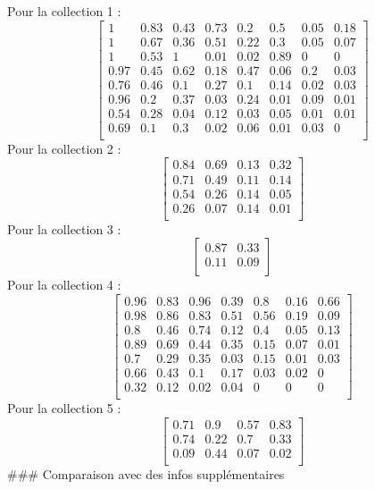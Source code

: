 Pour la collection 1 :
\[\begin{bmatrix} 1 &0.83 &0.43 &0.73 &0.2 &0.5 &0.05 &0.18 \\1 &0.67 &0.36 &0.51 &0.22 &0.3 &0.05 &0.07 \\1 &0.53 &1 &0.01 &0.02 &0.89 &0 &0 \\0.97 &0.45 &0.62 &0.18 &0.47 &0.06 &0.2 &0.03 \\0.76 &0.46 &0.1 &0.27 &0.1 &0.14 &0.02 &0.03 \\0.96 &0.2 &0.37 &0.03 &0.24 &0.01 &0.09 &0.01 \\0.54 &0.28 &0.04 &0.12 &0.03 &0.05 &0.01 &0.01 \\0.69 &0.1 &0.3 &0.02 &0.06 &0.01 &0.03 &0 \\ \end{bmatrix}\]
Pour la collection 2 :
\[\begin{bmatrix} 0.84 &0.69 &0.13 &0.32 \\0.71 &0.49 &0.11 &0.14 \\0.54 &0.26 &0.14 &0.05 \\0.26 &0.07 &0.14 &0.01 \\ \end{bmatrix}\]
Pour la collection 3 :
\[\begin{bmatrix} 0.87 &0.33 \\0.11 &0.09 \\ \end{bmatrix}\] Pour la
collection 4 :
\[\begin{bmatrix} 0.96 &0.83 &0.96 &0.39 &0.8 &0.16 &0.66 \\0.98 &0.86 &0.83 &0.51 &0.56 &0.19 &0.09 \\0.8 &0.46 &0.74 &0.12 &0.4 &0.05 &0.13 \\0.89 &0.69 &0.44 &0.35 &0.15 &0.07 &0.01 \\0.7 &0.29 &0.35 &0.03 &0.15 &0.01 &0.03 \\0.66 &0.43 &0.1 &0.17 &0.03 &0.02 &0 \\0.32 &0.12 &0.02 &0.04 &0 &0 &0 \\ \end{bmatrix}\]
Pour la collection 5 :
\[\begin{bmatrix} 0.71 &0.9 &0.57 &0.83 \\0.74 &0.22 &0.7 &0.33 \\0.09 &0.44 &0.07 &0.02 \\ \end{bmatrix}\]
\#\#\# Comparaison avec des infos supplémentaires

